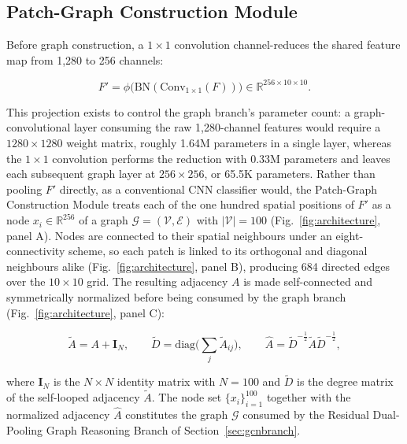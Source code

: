 \documentclass[journal]{IEEEtran}
\begin{document}
\subsection{Patch-Graph Construction Module}
\label{sec:patchgraph}
Before graph construction, a $1\times1$ convolution channel-reduces the shared
feature map from 1,280 to 256 channels:

\begingroup
\small
\begin{equation}
\label{eq:proj}
F' = \phi\big(\mathrm{BN}(\mathrm{Conv}_{1\times1}(F))\big)
\in \mathbb{R}^{256\times10\times10}.
\end{equation}
\endgroup

This projection exists to control the graph branch's parameter count: a
graph-convolutional layer consuming the raw 1,280-channel features would require
a $1280 \times 1280$ weight matrix, roughly 1.64M parameters in a single layer,
whereas the $1\times1$ convolution performs the reduction with 0.33M parameters
and leaves each subsequent graph layer at $256 \times 256$, or 65.5K parameters.
Rather than pooling $F'$ directly, as a conventional CNN classifier would, the
Patch-Graph Construction Module treats each of the one hundred spatial positions
of $F'$ as a node $x_i \in \mathbb{R}^{256}$ of a graph
$\mathcal{G}=(\mathcal{V},\mathcal{E})$ with $|\mathcal{V}|=100$
(Fig.~\ref{fig:architecture}, panel A). Nodes are connected to their spatial
neighbours under an eight-connectivity scheme, so each patch is linked to its
orthogonal and diagonal neighbours alike (Fig.~\ref{fig:architecture}, panel B),
producing 684 directed edges over the $10 \times 10$ grid. The resulting
adjacency $A$ is made self-connected and symmetrically normalized before being
consumed by the graph branch (Fig.~\ref{fig:architecture}, panel C):

\begingroup
\small
\begin{equation}
\label{eq:norm}
\tilde{A} = A + \mathbf{I}_{N}, \qquad
\tilde{D} = \mathrm{diag}\Big(\textstyle\sum_{j}\tilde{A}_{ij}\Big), \qquad
\hat{A} = \tilde{D}^{-\frac{1}{2}}\tilde{A}\tilde{D}^{-\frac{1}{2}},
\end{equation}
\endgroup

where $\mathbf{I}_{N}$ is the $N \times N$ identity matrix with $N=100$ and
$\tilde{D}$ is the degree matrix of the self-looped adjacency $\tilde{A}$. The
node set $\{x_i\}_{i=1}^{100}$ together with the normalized adjacency $\hat{A}$
constitutes the graph $\mathcal{G}$ consumed by the Residual Dual-Pooling Graph
Reasoning Branch of Section~\ref{sec:gcnbranch}.
\end{document}
